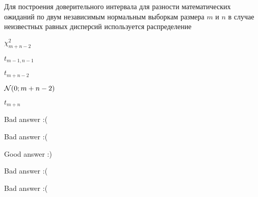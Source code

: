 
\begin{question}
Для построения доверительного интервала для разности математических
ожиданий по двум независимым нормальным выборкам размера \(m\) и \(n\) в
случае неизвестных равных дисперсий используется распределение
\begin{answerlist}
  \item \(\chi^2_{m+n-2}\)
  \item \(t_{m-1,n-1}\)
  \item \(t_{m+n-2}\)
  \item \(\mathcal{N}(0;m+n-2)\)
  \item \(t_{m+n}\)
\end{answerlist}
\end{question}

\begin{solution}
\begin{answerlist}
  \item Bad answer :(
  \item Bad answer :(
  \item Good answer :)
  \item Bad answer :(
  \item Bad answer :(
\end{answerlist}
\end{solution}

